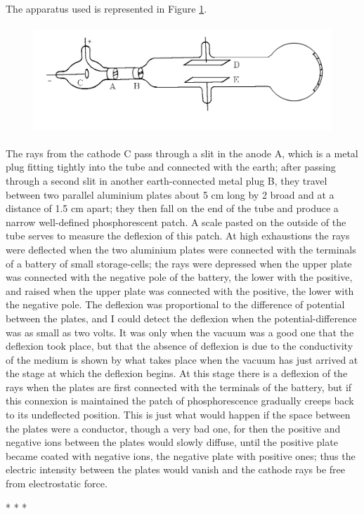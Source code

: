 The apparatus used is represented in Figure \ref{fig:thomson_2}.

\begin{figure}[h]
  \begin{center}
    \includegraphics[width=4.69333in,height=1.6in]{images/02_thomson/image009.png}
  \end{center}
  \vspace*{-10mm}
  \caption{}
  \label{fig:thomson_2}
\end{figure}

The rays from the cathode C pass through a slit in the anode A, which is
a metal plug fitting tightly into the tube and connected with the earth;
after passing through a second slit in another earth-connected metal
plug B, they travel between two parallel aluminium plates about 5 cm
long by 2 broad and at a distance of 1.5 cm apart; they then fall on the
end of the tube and produce a narrow well-defined phosphorescent patch.
A scale pasted on the outside of the tube serves to measure the
deflexion of this patch. At high exhaustions the rays were deflected
when the two aluminium plates were connected with the terminals of a
battery of small storage-cells; the rays were depressed when the upper
plate was connected with the negative pole of the battery, the lower
with the positive, and raised when the upper plate was connected with
the positive, the lower with the negative pole. The deflexion was
proportional to the difference of potential between the plates, and I
could detect the deflexion when the potential-difference was as small as
two volts. It was only when the vacuum was a good one that the deflexion
took place, but that the absence of deflexion is due to the conductivity
of the medium is shown by what takes place when the vacuum has just
arrived at the stage at which the deflexion begins. At this stage there
is a deflexion of the rays when the plates are first connected with the
terminals of the battery, but if this connexion is maintained the patch
of phosphorescence gradually creeps back to its undeflected position.
This is just what would happen if the space between the plates were a
conductor, though a very bad one, for then the positive and negative
ions between the plates would slowly diffuse, until the positive plate
became coated with negative ions, the negative plate with positive ones;
thus the electric intensity between the plates would vanish and the
cathode rays be free from electrostatic force.\\
\centerline{* * *}
%
